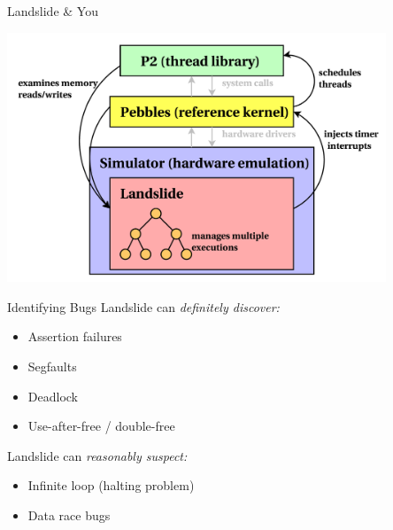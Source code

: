 \documentclass[xcolor=dvipsnames]{beamer}
\begin{document}
\begin{frame}{Landslide \& You}
	\begin{center}
	\includegraphics[width=0.85\textwidth]{landslide-new.pdf}
	\end{center}
\end{frame}

\begin{frame}{Identifying Bugs}
	Landslide can {\em definitely discover:}
	\begin{itemize}
		\item Assertion failures %
		\item Segfaults
		\item Deadlock
		\item Use-after-free / double-free
	\end{itemize}
	\linegap
	Landslide can {\em reasonably suspect:}
	\begin{itemize}
		\item Infinite loop (halting problem)
		\item Data race bugs
	\end{itemize}
\end{frame}
\end{document}
